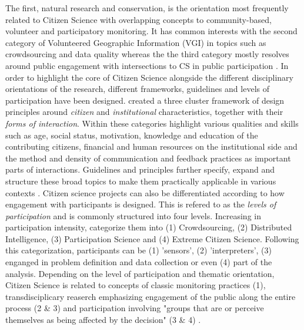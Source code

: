 {The first, natural research and conservation, is the orientation most frequently related to Citizen Science with overlapping concepts to community-based, volunteer and participatory monitoring. It has common interests with the second category of Volunteered Geographic Information (VGI) in topics such as crowdsourcing and data quality whereas the the third category mostly resolves around public engagement with intersections to CS in public participation \autocite{kullenbergWhatCitizenScience2016}. In order to highlight the core of Citizen Science alongside the different disciplinary orientations of the research, different frameworks, guidelines and levels of participation have been designed.\autocite{kirschkeCitizenScienceProjects2022} created a three cluster framework of design principles around \textit{citizen} and \textit{institutional} characteristics, together with their \textit{forms of interaction}. Within these categories \autocite{kirschkeCitizenScienceProjects2022} highlight various qualities and skills such as age, social status, motivation, knowledge and education of the contributing citizens, financial and human resources on the institutional side and the method and density of communication and feedback practices as important parts of interactions. Guidelines and principles further specify, expand and structure these broad topics to make them practically applicable in various contexts \autocite{citizenscience.govBasicStepsYour,escaTenPrinciplesCitizen2015,escaECSACharacteristicsCitizen2020,EUCitizenScience2023,fraislCitizenScienceEnvironmental2022,garciaFindingWhatYou2021,minkmanCitizenScienceWater2015,pocockStrategicFrameworkSupport,skarlatidouWhatVolunteersWant2019}. Citizen science projects can also be differentiated according to how engagement with participants is designed. This is refered to as the \textit{levels of participation} and is commonly structured into four levels. Increasing in participation intensity, \autocite{buckinghamshumGlobalParticipatoryPlatform2012} categorize them into (1) Crowdsourcing, (2) Distributed Intelligence, (3) Participation Science and (4) Extreme Citizen Science. Following this categorization, participants can be (1) 'sensors', (2) 'interpreters', (3) enganged in problem definition and data collection or even (4) part of the analysis. 
Depending on the level of participation and thematic orientation, Citizen Science is related to concepts of classic monitoring practices (1), transdisciplicary reaserch emphasizing engagement of the public along the entire process (2 & 3) and participation involving "groups that are or perceive themselves as being affected by the decision" (3 & 4) \autocites{buckinghamshumGlobalParticipatoryPlatform2012}{conradReviewCitizenScience2011}{minkmanCitizenScienceWater2015}[1]{rennParticipatoryProcessesDesigning2006}. 
}
